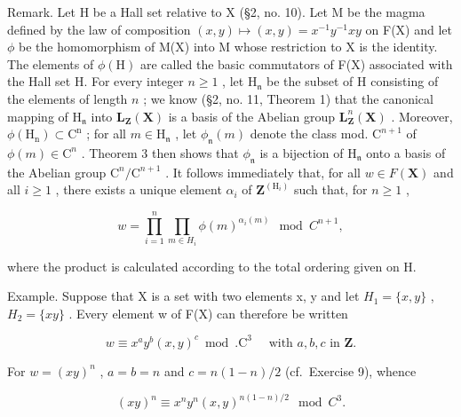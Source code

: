 Remark. Let H be a Hall set relative to X (§2, no. 10). Let M be the magma defined by the law of composition \((x,y)\mapsto (x,y) = x^{-1}y^{-1}xy\) on F(X) and let \(\phi\) be the homomorphism of M(X) into M whose restriction to X is the identity. The elements of \(\phi (\mathrm{H})\) are called the basic commutators of F(X) associated with the Hall set H. For every integer \(n\geqslant 1\) , let \(\mathrm{H}_{\mathfrak{n}}\) be the subset of H consisting of the elements of length \(n\) ; we know (§2, no. 11, Theorem 1) that the canonical mapping of \(\mathrm{H}_{\mathfrak{n}}\) into \(\mathbf{L}_{\mathbf{Z}}(\mathbf{X})\) is a basis of the Abelian group \(\mathbf{L}_{\mathbf{Z}}^{n} (\mathbf{X})\) . Moreover, \(\phi (\mathrm{H_n})\subset \mathrm{C^n}\) ; for all \(m\in \mathrm{H}_{\mathfrak{n}}\) , let \(\phi_{\mathfrak{n}}(m)\) denote the class mod. \(\mathrm{C}^{n + 1}\) of \(\phi (m)\in \mathrm{C}^n\) . Theorem 3 then shows that \(\phi_{\mathfrak{n}}\) is a bijection of \(\mathrm{H}_{\mathfrak{n}}\) onto a basis of the Abelian group \(\mathrm{C}^n /\mathrm{C}^{n + 1}\) . It follows immediately that, for all \(w\in F(\mathbf{X})\) and all \(i\geqslant 1\) , there exists a unique element \(\alpha_{i}\) of \(\mathbf{Z}^{(\mathrm{H}_{i})}\) such that, for \(n\geqslant 1\) ,

\[
w = \prod_ {i = 1} ^ {n} \prod_ {m \in H _ {i}} \phi (m) ^ {\alpha_ {i} (m)} \mod C ^ {n + 1},\tag{4}
\]

where the product is calculated according to the total ordering given on H.

Example. Suppose that X is a set with two elements x, y and let \(H_{1} = \{x, y\}\) , \(H_{2} = \{xy\}\) . Every element w of F(X) can therefore be written

\[
w \equiv x ^ {a} y ^ {b} (x, y) ^ {c} \bmod . \mathrm{C} ^ {3} \quad \text { with } a, b, c \text { in } \mathbf {Z}.
\]

For \(w = (xy)^n\) , \(a = b = n\) and \(c = n(1 - n)/2\) (cf.~Exercise 9), whence

\[
(x y) ^ {n} \equiv x ^ {n} y ^ {n} (x, y) ^ {n (1 - n) / 2} \mod C ^ {3}.
\]

